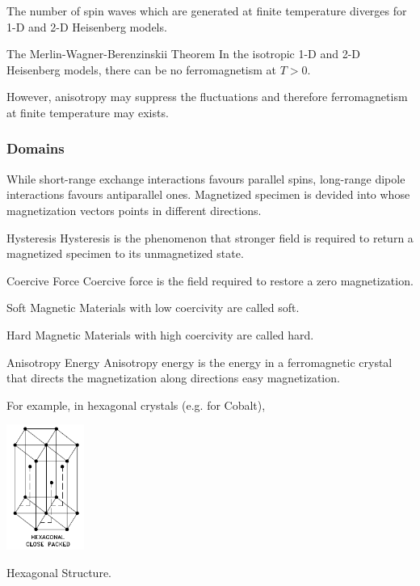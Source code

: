 \documentclass[hidelinks]{article}
\begin{document}
The number of spin waves which are generated at finite temperature diverges for 1-D and 2-D Heisenberg models.
\begin{finaleq}{The Merlin-Wagner-Berenzinskii Theorem}
    In the isotropic 1-D and 2-D Heisenberg models, there can be no ferromagnetism at $T>0$.
\end{finaleq}
However, anisotropy may suppress the fluctuations and therefore ferromagnetism at finite temperature may exists.


\subsubsection{Domains} %
\label{ssub:domains}

While short-range exchange interactions favours parallel spins, long-range dipole interactions favours antiparallel ones. Magnetized specimen is devided into  whose magnetization vectors points in different directions.
\begin{termdef}{Hysteresis}
    Hysteresis is the phenomenon that stronger field is required to return a magnetized specimen to its unmagnetized state.
\end{termdef}
\begin{termdef}{Coercive Force}
    Coercive force is the field required to restore a zero magnetization.
\end{termdef}
\begin{termdef}{Soft Magnetic}
    Materials with low coercivity are called soft.
\end{termdef}
\begin{termdef}{Hard Magnetic}
    Materials with high coercivity are called hard.
\end{termdef}
\begin{termdef}[-2.5\baselineskip]{Anisotropy Energy}
    Anisotropy energy is the energy in a ferromagnetic crystal that directs the magnetization along directions easy magnetization.
\end{termdef}
For example, in hexagonal crystals (e.g. for Cobalt), \begin{marginfigure}[-2.5cm]%
\captionsetup{justification=raggedright, width=1.5in}
    \includegraphics[width=1in]{src/Hexagonal-Close-packed-hcp-crystal-structure.png}
    \caption{Hexagonal Structure.}%
\end{marginfigure}%
\end{document}
